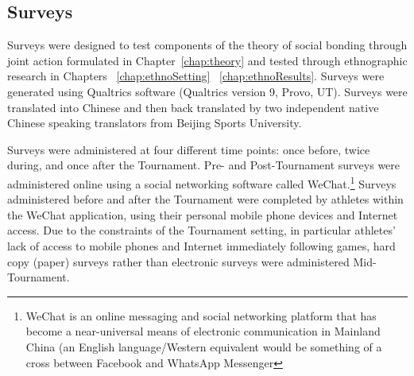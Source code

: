 \begin{CJK}{UTF8}{gbsn}


\subsection{Surveys}
Surveys were designed to test components of the theory of social bonding through joint action formulated in Chapter~\ref{chap:theory} and tested through ethnographic research in Chapters ~\ref{chap:ethnoSetting} \nobreakdash~\ref{chap:ethnoResults}.  Surveys were generated using Qualtrics software (Qualtrics version 9, Provo, UT). Surveys were translated into Chinese and then back translated by two independent native Chinese speaking translators from Beijing Sports University.

Surveys were administered at four different time points: once before, twice during, and once after the Tournament.  Pre- and Post-Tournament surveys were administered online using a social networking software called WeChat.\footnote{WeChat is an online messaging and social networking platform that has become a near-universal means of electronic communication in Mainland China (an English language/Western equivalent would be something of a cross between Facebook and WhatsApp Messenger} Surveys administered before and after the Tournament were completed by athletes within the WeChat application, using their personal mobile phone devices and Internet access.  Due to the constraints of the Tournament setting, in particular athletes’ lack of access to mobile phones and Internet immediately following games, hard copy (paper) surveys rather than electronic surveys were administered Mid-Tournament.






\end{CJK}
